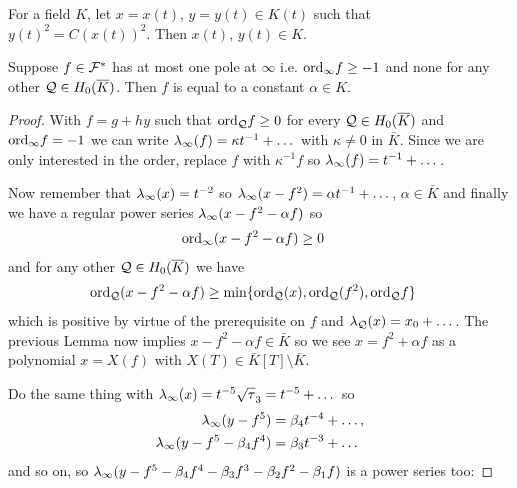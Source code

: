 \documentclass[english,11pt,a4paper]{article}
\begin{document}
\begin{theorem}\label{satz1}
  For a field $K$, let $x = x(t)$, $y = y(t) \in K(t)$ such that $y(t)^2 = C(x(t))^2$. Then $x(t)$, $y(t) \in K$.
\end{theorem}

\begin{lemma}\label{onepol}
	Suppose $f \in \mathcal{F}^*$ has at most one pole at $\infty$ i.e. $\text{ord}_{\infty} f \geq -1$ and none for any other $\mathcal{Q} \in H_0(\overline K)$. Then $f$ is equal to a constant $\alpha \in K$.

	\begin{proof}
		With $f = g+hy$ such that $\text{ord}_{\mathcal{Q}} f \geq 0$ for every $\mathcal{Q} \in H_0(\overline K)$ and $\text{ord}_{\infty} f = -1$ we can write $\lambda_{\infty} (f) = \kappa t^{-1} + \dots$ with $\kappa \neq 0$ in $\bar K$. Since we are only interested in the order, replace $f$ with $\kappa^{-1} f$ so $\lambda_{\infty} (f) = t^{-1} + \dots$.

		Now remember that $\lambda_{\infty} (x) = t^{-2}$ so $\lambda_{\infty} (x - f^2) = \alpha t^{-1} + \dots$, $\alpha \in \bar K$ and finally we have a regular power series $\lambda_{\infty} (x - f^2 - \alpha f)$ so
		\begin{align*}
		  \text{ord}_{\infty} (x - f^2 - \alpha f) &\geq 0
		\end{align*}
		and for any other $\mathcal{Q} \in H_0(\overline K)$ we have
		\begin{align*}
		  \text{ord}_{\mathcal{Q}} (x - f^2 - \alpha f) &\geq \min \{ \text{ord}_{\mathcal{Q}} (x) , \text{ord}_{\mathcal{Q}} (f^2) , \text{ord}_{\mathcal{Q}} f \}
		\end{align*}
		which is positive by virtue of the prerequisite on $f$ and $\lambda_{\mathcal{Q}}(x) = x_0 + \dots$. The previous Lemma now implies $x - f^2 - \alpha f \in \bar K$ so we see $x = f^2 + \alpha f$ as a polynomial $x = X(f)$ with $X(T) \in \bar K[T] \setminus \bar K$.

		Do the same thing with $\lambda_{\infty} (x) = t^{-5}\sqrt \tau_3 = t^{-5} + \dots$ so
		\begin{align*}
		  \lambda_{\infty} (y - f^5) &= \beta_4 t^{-4} + \dots,\\
		  \lambda_{\infty} (y - f^5 - \beta_4 f^4) &= \beta_3 t^{-3} + \dots
		\end{align*}
		and so on, so $\lambda_{\infty} (y - f^5 - \beta_4 f^4 - \beta_3 f^3 - \beta_2 f^2 - \beta_1 f)$ is a power series too:


\end{proof}
\end{lemma}
\end{document}
